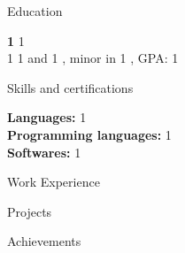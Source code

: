 \documentclass{resume} %
\newcommand{\myaddress}{%
  1 $\vert$ 1 $\vert$ 1 $\vert$ \href{1}{\underline{1}} %
}
\begin{document}
\printaddress{\myaddress}

\vspace{-0.9em}
\begin{rSection}{Education}

{\bf 1} \hfill {1}
\\
1 1 and 1%
, minor in 1%
, GPA: 1
\\

\end{rSection}


\vspace{-0.4em}
\begin{rSection}{Skills and certifications}

{\textbf{Languages: }1
}
\\{\textbf{Programming languages: }1}%
\\{\textbf{Softwares: }1}%

\end{rSection}



\vspace{-0.4em}

\begin{rSection}{Work Experience}
\end{rSection}




\vspace{-0.4em}

\begin{rSection}{Projects}
\end{rSection}

\vspace{-0.2em}

\begin{rSection}{Achievements}
\end{rSection}

\end{document}
